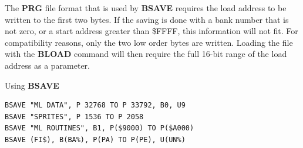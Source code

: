 \begin{description}[leftmargin=2cm,style=nextline]
   The {\bf PRG} file format that is used by {\bf BSAVE}
   requires the load address to be written to the first two bytes.
   If the saving is done with a bank number that is not zero,
   or a start address greater than \$FFFF, this information will not
   fit. For compatibility reasons, only the two low order bytes
   are written. Loading the file with the {\bf BLOAD} command will then
   require the full 16-bit range of the load address as a parameter.

\item [Examples:] Using {\bf BSAVE}
\begin{tcolorbox}[colback=black,coltext=white]
\verbatimfont{\codefont}
\begin{verbatim}
BSAVE "ML DATA", P 32768 TO P 33792, B0, U9
BSAVE "SPRITES", P 1536 TO P 2058
BSAVE "ML ROUTINES", B1, P($9000) TO P($A000)
BSAVE (FI$), B(BA%), P(PA) TO P(PE), U(UN%)
\end{verbatim}
\end{tcolorbox}
\end{description}


\newpage
